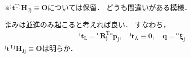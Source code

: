 ﻿\documentclass[a4paper]{jsarticle}
\begin{document}
※${}^{\mathrm{j}}\bm{t}^{\mathrm{T}}{}^{\mathrm{j}}\bm{H}_{\mathrm{Jj}}\equiv\bm{O}$については保留．
どうも間違いがある模様．


\vspace{\baselineskip}


歪みは並進のみ起こると考えれば良い．
すなわち，
\begin{align*}
{}^{\mathrm{j}}\bm{t}_{\mathrm{L}}={}^{\mathrm{o}}\bm{R}_{\mathrm{j}}^{\mathrm{T}}{}^{\mathrm{o}}\bm{p}_{\mathrm{j}},\quad
{}^{\mathrm{j}}\bm{t}_{\mathrm{A}}\equiv\bm{0},\quad
\bm{q}={}^{\mathrm{o}}\bm{\xi}_{\mathrm{j}}
\end{align*}
${}^{\mathrm{j}}\bm{t}^{\mathrm{T}}{}^{\mathrm{j}}\bm{H}_{\mathrm{Jj}}\equiv\bm{O}$は明らか．


\vspace{\baselineskip}

\end{document}
